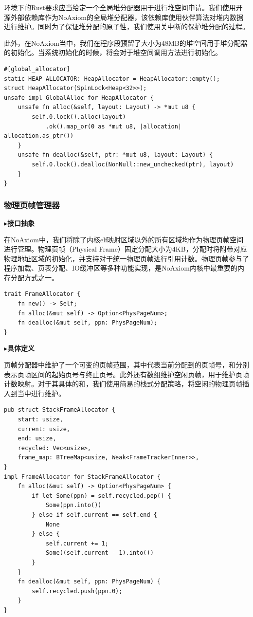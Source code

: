 \documentclass{article}
\begin{document}
环境下的Rust要求应当给定一个全局堆分配器用于进行堆空间申请。我们使用开源外部依赖库作为NoAxiom的全局堆分配器，该依赖库使用伙伴算法对堆内数据进行维护。同时为了保证堆分配的原子性，我们使用关中断的保护堆分配的过程。

此外，在NoAxiom当中，我们在程序段预留了大小为48MB的堆空间用于堆分配器的初始化。当系统初始化的时候，将会对于堆空间调用方法进行初始化。

\begin{lstlisting}
#[global_allocator]
static HEAP_ALLOCATOR: HeapAllocator = HeapAllocator::empty();
struct HeapAllocator(SpinLock<Heap<32>>);
unsafe impl GlobalAlloc for HeapAllocator {
    unsafe fn alloc(&self, layout: Layout) -> *mut u8 {
        self.0.lock().alloc(layout)
            .ok().map_or(0 as *mut u8, |allocation| allocation.as_ptr())
    }
    unsafe fn dealloc(&self, ptr: *mut u8, layout: Layout) {
        self.0.lock().dealloc(NonNull::new_unchecked(ptr), layout)
    }
}
\end{lstlisting}

\subsubsection{物理页帧管理器}

$\blacktriangleright$\textbf{接口抽象}

在NoAxiom中，我们将除了内核elf映射区域以外的所有区域均作为物理页帧空间进行管理。物理页帧（Physical Frame）固定分配大小为4KB，分配时将附带对应物理地址区域的初始化，并支持对于统一物理页帧进行引用计数。物理页帧参与了程序加载、页表分配、IO缓冲区等多种功能实现，是NoAxiom内核中最重要的内存分配方式之一。

\begin{lstlisting}
trait FrameAllocator {
    fn new() -> Self;
    fn alloc(&mut self) -> Option<PhysPageNum>;
    fn dealloc(&mut self, ppn: PhysPageNum);
}
\end{lstlisting}

$\blacktriangleright$\textbf{具体定义}

页帧分配器中维护了一个可变的页帧范围，其中代表当前分配到的页帧号，和分别表示页帧区间的起始页号与终止页号。此外还有数组维护空闲页帧，用于维护页帧计数映射。对于其具体的和，我们使用简易的栈式分配策略，将空闲的物理页帧插入到当中进行维护。

\begin{lstlisting}
pub struct StackFrameAllocator {
    start: usize,
    current: usize,
    end: usize,
    recycled: Vec<usize>,
    frame_map: BTreeMap<usize, Weak<FrameTrackerInner>>,
}
impl FrameAllocator for StackFrameAllocator {
    fn alloc(&mut self) -> Option<PhysPageNum> {
        if let Some(ppn) = self.recycled.pop() {
            Some(ppn.into())
        } else if self.current == self.end {
            None
        } else {
            self.current += 1;
            Some((self.current - 1).into())
        }
    }
    fn dealloc(&mut self, ppn: PhysPageNum) {
        self.recycled.push(ppn.0);
    }
}
\end{lstlisting}
\end{document}
